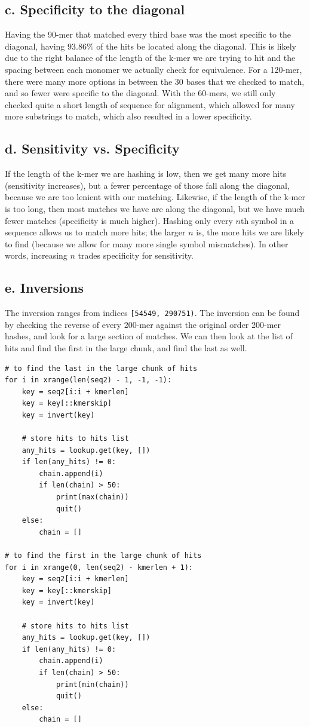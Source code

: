 \documentclass[a4paper]{article}
\begin{document}
\subsection*{c. Specificity to the diagonal}
Having the 90-mer that matched every third base was the most
specific to the diagonal, having $93.86\%$ of the hits be
located along the diagonal. This is likely due to the right
balance of the length of the k-mer we are trying to hit and
the spacing between each monomer we actually check for
equivalence. For a 120-mer, there were many more options in
between the 30 bases that we checked to match, and so fewer
were specific to the diagonal. With the 60-mers, we
still only checked quite a short length of sequence for
alignment, which allowed for many more substrings to match,
which also resulted in a lower specificity.

\subsection*{d. Sensitivity vs. Specificity}
If the length of the k-mer we are hashing is low, then we
get many more hits (sensitivity increases), but a fewer
percentage of those fall along the diagonal, because we
are too lenient with our matching. Likewise, if the length
of the k-mer is too long, then most matches we have are along
the diagonal, but we have much fewer matches (specificity
is much higher). Hashing only every $n$th symbol in a sequence
allows us to match more hits; the larger $n$ is, the more
hits we are likely to find (because we allow for many more
single symbol mismatches). In other words, increasing $n$
trades specificity for sensitivity.

\subsection*{e. Inversions}
The inversion ranges from indices {\tt [54549, 290751)}. The
inversion can be found by checking the reverse of every 200-mer
against the original order 200-mer hashes, and look for a
large section of matches. We can then look at the list of
hits and find the first in the large chunk, and find the last
as well.

\begin{verbatim}
# to find the last in the large chunk of hits
for i in xrange(len(seq2) - 1, -1, -1):
    key = seq2[i:i + kmerlen]
    key = key[::kmerskip]
    key = invert(key)

    # store hits to hits list
    any_hits = lookup.get(key, [])
    if len(any_hits) != 0:
        chain.append(i)
        if len(chain) > 50:
            print(max(chain))
            quit()
    else:
        chain = []

# to find the first in the large chunk of hits
for i in xrange(0, len(seq2) - kmerlen + 1):
    key = seq2[i:i + kmerlen]
    key = key[::kmerskip]
    key = invert(key)

    # store hits to hits list
    any_hits = lookup.get(key, [])
    if len(any_hits) != 0:
        chain.append(i)
        if len(chain) > 50:
            print(min(chain))
            quit()
    else:
        chain = []
\end{verbatim}
\end{document}
